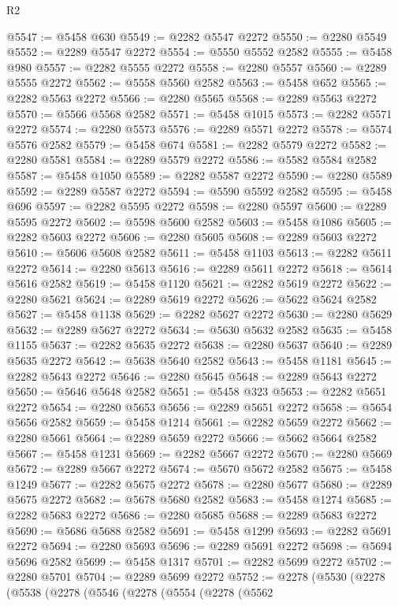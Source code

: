 \begin{lexlean}{R2}
\begin{coremodule}
@5547 := @5458 @630
@5549 := @2282 @5547 @2272
@5550 := @2280 @5549
@5552 := @2289 @5547 @2272
@5554 := @5550 @5552 @2582
@5555 := @5458 @980
@5557 := @2282 @5555 @2272
@5558 := @2280 @5557
@5560 := @2289 @5555 @2272
@5562 := @5558 @5560 @2582
@5563 := @5458 @652
@5565 := @2282 @5563 @2272
@5566 := @2280 @5565
@5568 := @2289 @5563 @2272
@5570 := @5566 @5568 @2582
@5571 := @5458 @1015
@5573 := @2282 @5571 @2272
@5574 := @2280 @5573
@5576 := @2289 @5571 @2272
@5578 := @5574 @5576 @2582
@5579 := @5458 @674
@5581 := @2282 @5579 @2272
@5582 := @2280 @5581
@5584 := @2289 @5579 @2272
@5586 := @5582 @5584 @2582
@5587 := @5458 @1050
@5589 := @2282 @5587 @2272
@5590 := @2280 @5589
@5592 := @2289 @5587 @2272
@5594 := @5590 @5592 @2582
@5595 := @5458 @696
@5597 := @2282 @5595 @2272
@5598 := @2280 @5597
@5600 := @2289 @5595 @2272
@5602 := @5598 @5600 @2582
@5603 := @5458 @1086
@5605 := @2282 @5603 @2272
@5606 := @2280 @5605
@5608 := @2289 @5603 @2272
@5610 := @5606 @5608 @2582
@5611 := @5458 @1103
@5613 := @2282 @5611 @2272
@5614 := @2280 @5613
@5616 := @2289 @5611 @2272
@5618 := @5614 @5616 @2582
@5619 := @5458 @1120
@5621 := @2282 @5619 @2272
@5622 := @2280 @5621
@5624 := @2289 @5619 @2272
@5626 := @5622 @5624 @2582
@5627 := @5458 @1138
@5629 := @2282 @5627 @2272
@5630 := @2280 @5629
@5632 := @2289 @5627 @2272
@5634 := @5630 @5632 @2582
@5635 := @5458 @1155
@5637 := @2282 @5635 @2272
@5638 := @2280 @5637
@5640 := @2289 @5635 @2272
@5642 := @5638 @5640 @2582
@5643 := @5458 @1181
@5645 := @2282 @5643 @2272
@5646 := @2280 @5645
@5648 := @2289 @5643 @2272
@5650 := @5646 @5648 @2582
@5651 := @5458 @323
@5653 := @2282 @5651 @2272
@5654 := @2280 @5653
@5656 := @2289 @5651 @2272
@5658 := @5654 @5656 @2582
@5659 := @5458 @1214
@5661 := @2282 @5659 @2272
@5662 := @2280 @5661
@5664 := @2289 @5659 @2272
@5666 := @5662 @5664 @2582
@5667 := @5458 @1231
@5669 := @2282 @5667 @2272
@5670 := @2280 @5669
@5672 := @2289 @5667 @2272
@5674 := @5670 @5672 @2582
@5675 := @5458 @1249
@5677 := @2282 @5675 @2272
@5678 := @2280 @5677
@5680 := @2289 @5675 @2272
@5682 := @5678 @5680 @2582
@5683 := @5458 @1274
@5685 := @2282 @5683 @2272
@5686 := @2280 @5685
@5688 := @2289 @5683 @2272
@5690 := @5686 @5688 @2582
@5691 := @5458 @1299
@5693 := @2282 @5691 @2272
@5694 := @2280 @5693
@5696 := @2289 @5691 @2272
@5698 := @5694 @5696 @2582
@5699 := @5458 @1317
@5701 := @2282 @5699 @2272
@5702 := @2280 @5701
@5704 := @2289 @5699 @2272
@5752 := @2278
    (@5530
      (@2278
        (@5538
          (@2278
            (@5546
              (@2278
                (@5554
                  (@2278
                    (@5562

\end{coremodule}
\end{lexlean}
